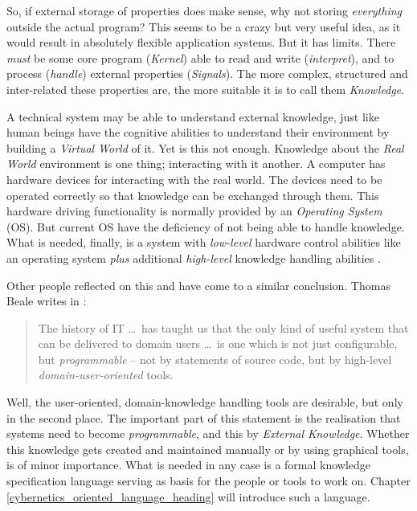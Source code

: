 So, if external storage of properties does make sense, why not storing
\emph{everything} outside the actual program? This seems to be a crazy but very
useful idea, as it would result in absolutely flexible application systems. But
it has limits. There \emph{must} be some core program (\emph{Kernel}) able to
read and write (\emph{interpret}), and to process (\emph{handle}) external
properties (\emph{Signals}). The more complex, structured and inter-related
these properties are, the more suitable it is to call them \emph{Knowledge}.

A technical system may be able to understand external knowledge, just like
human beings have the cognitive abilities to understand their environment by
building a \emph{Virtual World} of it. Yet is this not enough. Knowledge about
the \emph{Real World} environment is one thing; interacting with it another. A
computer has hardware devices for interacting with the real world. The devices
need to be operated correctly so that knowledge can be exchanged through them.
This hardware driving functionality is normally provided by an
\emph{Operating System} (OS). But current OS have the deficiency of not being
able to handle knowledge. What is needed, finally, is a system with
\emph{low-level} hardware control abilities like an operating system
\emph{plus} additional \emph{high-level} knowledge handling abilities
\cite{heller2004}.

Other people reflected on this and have come to a similar conclusion. Thomas
Beale writes in \cite{openhealth}:

\begin{quote}
    The history of IT \ldots\ has taught us that the only kind of useful system
    that can be delivered to domain users \ldots\ is one which is not just
    configurable, but \emph{programmable} -- not by statements of source code,
    but by high-level \emph{domain-user-oriented} tools.
\end{quote}

Well, the user-oriented, domain-knowledge handling tools are desirable, but only
in the second place. The important part of this statement is the realisation that
systems need to become \emph{programmable}, and this by \emph{External Knowledge}.
Whether this knowledge gets created and maintained manually or by using graphical
tools, is of minor importance. What is needed in any case is a formal knowledge
specification language serving as basis for the people or tools to work on.
Chapter \ref{cybernetics_oriented_language_heading} will introduce such a
language.
